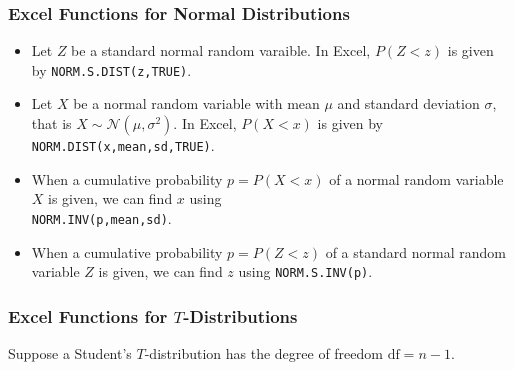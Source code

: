 \hypertarget{excel-functions-for-normal-distributions}{%
\subsubsection{Excel Functions for Normal
Distributions}\label{excel-functions-for-normal-distributions}}

\begin{itemize}
\item
  Let \(Z\) be a standard normal random varaible. In Excel, \(P(Z<z)\)
  is given by \texttt{NORM.S.DIST(z,TRUE)}.
\item
  Let \(X\) be a normal random variable with mean \(\mu\) and standard
  deviation \(\sigma\), that is \(X\sim \mathcal{N}(\mu, \sigma^2)\). In
  Excel, \(P(X<x)\) is given by \texttt{NORM.DIST(x,mean,sd,TRUE)}.
\item
  When a cumulative probability \(p=P(X<x)\) of a normal random variable
  \(X\) is given, we can find \(x\) using\\ \texttt{NORM.INV(p,mean,sd)}.
\item
  When a cumulative probability \(p=P(Z<z)\) of a standard normal random
  variable \(Z\) is given, we can find \(z\) using
  \texttt{NORM.S.INV(p)}.
\end{itemize}

\hypertarget{excel-functions-for-t-distributions}{%
\subsubsection{\texorpdfstring{Excel Functions for
\(T\)-Distributions}{Excel Functions for T-Distributions}}\label{excel-functions-for-t-distributions}}

Suppose a Student's \(T\)-distribution has the degree of freedom
\(\text{df}=n-1\).

